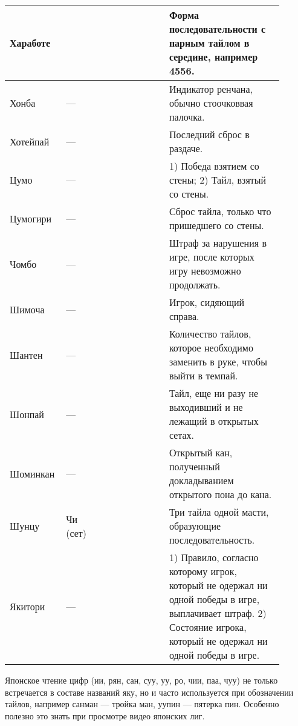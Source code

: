 \begin{tabularx}{\linewidth}{L{0.14\linewidth}L{0.13\linewidth}L{0.1\linewidth}L{0.13\linewidth}L{0.4\linewidth}}
	\midrule
	Хаработе & & & & Форма последовательности с парным тайлом в середине, например 4556. \\
	\midrule
	Хонба & --- &  &  & Индикатор ренчана, обычно стоочковвая палочка. \\
	\midrule
	Хотейпай & --- &  &  & Последний сброс в раздаче. \\
	\midrule
	Цумо & --- &  &  & 1) Победа взятием со стены; 2) Тайл, взятый со стены. \\
	\midrule
	Цумогири & --- &  &  & Сброс тайла, только что пришедшего со стены. \\
	\midrule
	Чомбо & --- &  &  & Штраф за нарушения в игре, после которых игру невозможно продолжать. \\
	\midrule
	Шимоча & --- &  &  & Игрок, сидяющий справа. \\
	\midrule
	Шантен & --- &  &  & Количество тайлов, которое необходимо заменить в руке, чтобы выйти в темпай. \\
	\midrule
	Шонпай & --- &  &  & Тайл, еще ни разу не выходивший и не лежащий в открытых сетах. \\
	\midrule
	Шоминкан & --- &  &   & Открытый кан, полученный докладыванием открытого пона до кана. \\
	\midrule
	Шунцу & Чи (сет) &  &  & Три тайла одной масти, образующие последовательность. \\
	\midrule
	Якитори & --- &  &  & 1) Правило, согласно которому игрок, который не одержал ни одной победы в игре, выплачивает штраф. 2) Состояние игрока, который не одержал ни одной победы в игре. \\
\end{tabularx}

Японское чтение цифр (ии, рян, сан, суу, уу, ро, чии, паа, чуу) не только встречается в составе названий яку, но и часто используется при обозначении тайлов, например санман --- тройка ман, уупин --- пятерка пин. Особенно полезно это знать при просмотре видео японских лиг.

